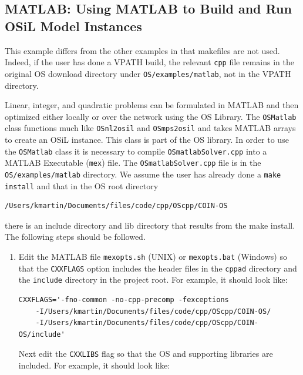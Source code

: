 \documentclass[11pt]{article}
\renewcommand{\_}{{\char"5F}}
\renewcommand{\{}{{\char"7B}}
\renewcommand{\}}{{\char"7D}}
\renewcommand{\^}{{\char"0D}}
\renewcommand{\'}{{\char"0D}}
\begin{document}
\begin{enumerate}[Step 1:]



\subsection{MATLAB:  Using MATLAB to Build and Run OSiL Model Instances}\label{section:usingmatlab}

This example differs from the other examples in that makefiles are not used.
Indeed, if the user has done a VPATH build, the relevant {\tt cpp} file remains
in the original OS download directory under {\tt OS/examples/matlab},
not in the VPATH directory.




Linear, integer, and quadratic problems can be formulated in MATLAB and then optimized
either locally or over the network using the OS Library. The {\tt OSMatlab} class functions much like
{\tt OSnl2osil} and {\tt OSmps2osil}
and takes MATLAB arrays to create an OSiL instance.  This class is part of the OS library.
In order to use the {\tt OSMatlab} class it is necessary to  compile
{\tt OSmatlabSolver.cpp}  into  a MATLAB Executable ({\tt mex}) file.
The {\tt OSmatlabSolver.cpp} file is in the {\tt  OS/examples/matlab} directory.
We  assume the user has already done a {\tt make install} and that in the OS root directory
\begin{verbatim}
/Users/kmartin/Documents/files/code/cpp/OScpp/COIN-OS
\end{verbatim}
there is an include directory and lib directory that results from the make install.  The following steps should be followed.


\begin{enumerate}[{\bf Step 1:}]



\item{} Edit the MATLAB file {\tt mexopts.sh} (UNIX) or {\tt mexopts.bat}  (Windows) so that the {\tt CXXFLAGS} option includes the header files in the {\tt cppad} directory and the {\tt include} directory in the project root. For example, it  should look like:
\begin{verbatim}
CXXFLAGS='-fno-common -no-cpp-precomp -fexceptions
    -I/Users/kmartin/Documents/files/code/cpp/OScpp/COIN-OS/
    -I/Users/kmartin/Documents/files/code/cpp/OScpp/COIN-OS/include'
\end{verbatim}

Next edit the {\tt CXXLIBS} flag so that the OS and supporting libraries are included. For example, it should look like:


\end{enumerate}
\end{enumerate}
\end{document}
